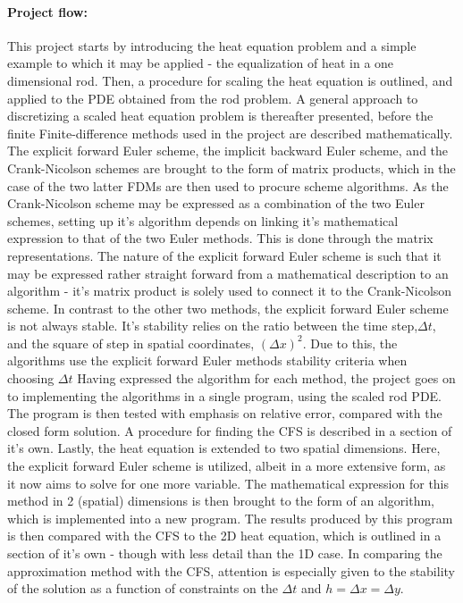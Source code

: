 \documentclass[%
oneside,                 %
final,                   %
10pt]{article}
\begin{document}
\paragraph{Project flow:} This project starts by introducing the heat equation problem and a simple example to which it may be applied - the equalization of heat in a one dimensional rod. Then, a procedure for scaling the heat equation is outlined, and applied to the PDE obtained from the rod problem. A general approach to discretizing a scaled heat equation problem is thereafter presented, before the finite Finite-difference methods used in the project are described mathematically.\newline
The explicit forward Euler scheme, the implicit backward Euler scheme, and the Crank-Nicolson schemes are brought to the form of matrix products, which in the case of the two latter FDMs are then used to procure scheme algorithms. As the Crank-Nicolson scheme may be expressed as a combination of the two Euler schemes, setting up it's algorithm depends on linking it's mathematical expression to that of the two Euler methods. This is done through the matrix representations. The nature of the explicit forward Euler scheme is such that it may be expressed rather straight forward from a mathematical description to an algorithm - it's matrix product is solely used to connect it to the Crank-Nicolson scheme. In contrast to the other two methods, the explicit forward Euler scheme is not always stable. It's stability relies on the ratio between the time step,$\Delta t$, and the square of step in spatial coordinates, $(\Delta x)^2$. Due to this, the algorithms use the explicit forward Euler methods stability criteria when choosing $\Delta t$ \newline
Having expressed the algorithm for each method, the project goes on to implementing the algorithms in a single program, using the scaled rod PDE. The program is then tested with emphasis on relative error, compared with the closed form solution. A procedure for finding the CFS is described in a section of it's own. \newline
Lastly, the heat equation is extended to two spatial dimensions. Here, the explicit forward Euler scheme is utilized, albeit in a more extensive form, as it now aims to solve for one more variable. The mathematical expression for this method in 2 (spatial) dimensions is then brought to the form of an algorithm, which is implemented into a new program. The results produced by this program is then compared with the CFS to the 2D heat equation, which is outlined in a section of it's own - though with less detail than the 1D case. In comparing the approximation method with the CFS, attention is especially given to the stability of the solution as a function of constraints on the $\Delta t$ and $h=\Delta x =\Delta y$.
\end{document}

